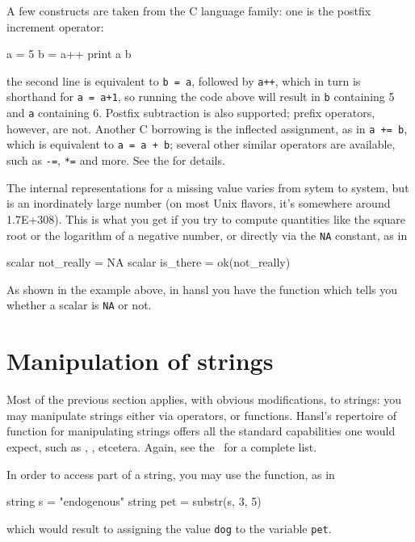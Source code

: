 A few constructs are taken from the C language family: one is the
postfix increment operator:
\begin{code}
  a = 5
  b = a++
  print a b
\end{code}
the second line is equivalent to \texttt{b = a}, followed by
\texttt{a++}, which in turn is shorthand for \texttt{a = a+1}, so
running the code above will result in \texttt{b} containing 5 and
\texttt{a} containing 6. Postfix subtraction is also supported; prefix
operators, however, are not. Another C borrowing is the inflected
assignment, as in \texttt{a += b}, which is equivalent to \texttt{a =
  a + b}; several other similar operators are available, such as
\texttt{-=}, \texttt{*=} and more. See the \GCR{} for details.

The internal representations for a missing value varies from sytem to
system, but is an inordinately large number (on most Unix flavors,
it's somewhere around 1.7E+308). This is what you get if you try to
compute quantities like the square root or the logarithm of a negative
number, or directly via the \texttt{NA} constant, as in
\begin{code}
  scalar not_really = NA
  scalar is_there = ok(not_really)
\end{code}
As shown in the example above, in hansl you have the  function
which tells you whether a scalar is \texttt{NA} or not.

\section{Manipulation of strings}

Most of the previous section applies, with obvious modifications, to
strings: you may manipulate strings either via operators, or
functions. Hansl's repertoire of function for manipulating strings
offers all the standard capabilities one would expect, such as
, ,  etcetera. Again, see the \GCR\
for a complete list.

In order to access part of a string, you may use the 
function, as in
\begin{code}
  string s = "endogenous"
  string pet = substr(s, 3, 5)
\end{code}
which would result to assigning the value \texttt{dog} to the variable
\texttt{pet}.

